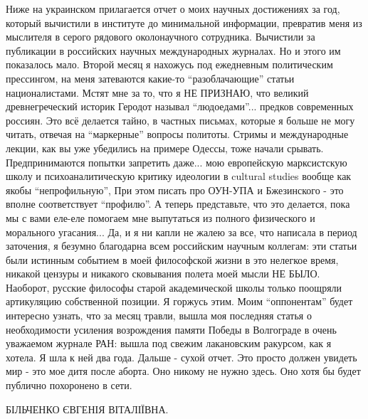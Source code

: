 Ниже на украинском прилагается отчет о моих научных достижениях за год, который
вычистили в институте до минимальной информации, превратив меня из мыслителя в
серого рядового околонаучного сотрудника. Вычистили за публикации в российских
научных международных журналах. Но и этого им показалось мало. Второй месяц я
нахожусь под ежедневным политическим прессингом, на меня затеваются какие-то
\enquote{разоблачающие} статьи националистами. Мстят мне за то, что я НЕ ПРИЗНАЮ, что
великий древнегреческий историк Геродот называл \enquote{людоедами}... предков
современных россиян. Это всё делается тайно, в частных письмах, которые я
больше не могу читать, отвечая на \enquote{маркерные} вопросы политоты. Стримы и
международные лекции, как вы уже убедились на примере Одессы, тоже начали
срывать. Предпринимаются попытки запретить даже... мою европейскую марксистскую
школу и психоаналитическую критику идеологии в cultural studies вообще как
якобы \enquote{непрофильную}, При этом писать про ОУН-УПА и Бжезинского - это вполне
соответствует \enquote{профилю}. А теперь представьте, что это делается, пока мы с вами
еле-еле помогаем мне выпутаться из полного физического и морального угасания...
Да, и я ни капли не жалею за все, что написала в период заточения, я безумно
благодарна всем российским научным коллегам: эти статьи были истинным событием
в моей философской жизни в это нелегкое время, никакой цензуры и никакого
сковывания полета моей мысли НЕ БЫЛО. Наоборот, русские философы старой
академической школы только поощряли артикуляцию собственной позиции. Я горжусь
этим. Моим \enquote{оппонентам} будет интересно узнать, что за месяц травли, вышла моя
последняя статья о необходимости усиления возрождения памяти Победы в
Волгограде в очень уважаемом журнале РАН: вышла под свежим лакановским
ракурсом, как я хотела. Я шла к ней два года. Дальше - сухой отчет. Это просто
должен увидеть мир - это мое дитя после аборта. Оно никому не нужно здесь. Оно
хотя бы будет публично похоронено в сети.

БІЛЬЧЕНКО ЄВГЕНІЯ ВІТАЛІЇВНА.

